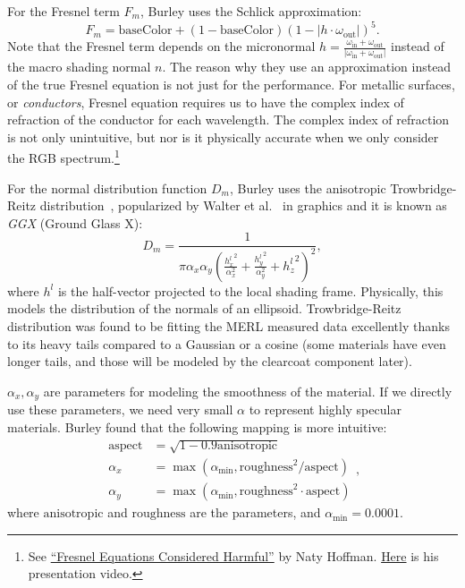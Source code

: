 For the Fresnel term $F_m$, Burley uses the Schlick approximation:
\begin{equation}
F_m = \text{baseColor} + (1 - \text{baseColor}) (1 - |h \cdot \omega_{\text{out}}|)^5.
\end{equation}
Note that the Fresnel term depends on the micronormal 
$h = \frac{\omega_{\text{in}} + \omega_{\text{out}}}{\left| \omega_{\text{in}} + \omega_{\text{out}} \right|}$ 
instead of the macro shading normal $n$. The reason why they use an approximation instead of the true Fresnel equation is not just for the performance. For metallic surfaces, or \emph{conductors}, Fresnel equation requires us to have the complex index of refraction of the conductor for each wavelength. The complex index of refraction is not only unintuitive, but nor is it physically accurate when we only consider the RGB spectrum.\footnote{See \href{http://renderwonk.com/publications/mam2019/}{``Fresnel Equations Considered Harmful''} by Naty Hoffman. \href{https://www.youtube.com/watch?v=kEcDbl7eS0w}{Here} is his presentation video.} 

For the normal distribution function $D_m$, Burley uses the anisotropic Trowbridge-Reitz distribution~\cite{Trowbridge:1975:AIR}, popularized by Walter et al.~\cite{Walter:2007:MMR} in graphics and it is known as \emph{GGX} (Ground Glass X):
\begin{equation}
D_m = \frac{1}{\pi \alpha_x \alpha_y \left(\frac{{h^l_x}^2}{\alpha_x^2} + \frac{{h^l_y}^2}{\alpha_y^2} + {h^l_z}^2\right)^2},
\end{equation}
where $h^l$ is the half-vector projected to the local shading frame. Physically, this models the distribution of the normals of an ellipsoid. Trowbridge-Reitz distribution was found to be fitting the MERL measured data excellently thanks to its heavy tails compared to a Gaussian or a cosine (some materials have even longer tails, and those will be modeled by the clearcoat component later). 

$\alpha_x, \alpha_y$ are parameters for modeling the smoothness of the material. If we directly use these parameters, we need very small $\alpha$ to represent highly specular materials. Burley found that the following mapping is more intuitive:
\begin{equation}
\begin{aligned}
\text{aspect} &= \sqrt{1 - 0.9 \text{anisotropic}} \\
\alpha_x &= \max(\alpha_{\text{min}}, \text{roughness}^2 / \text{aspect}) \\
\alpha_y &= \max(\alpha_{\text{min}}, \text{roughness}^2 \cdot \text{aspect})
\end{aligned},
\end{equation}
where $\text{anisotropic}$ and $\text{roughness}$ are the parameters, and $\alpha_{\text{min}} = 0.0001$.

